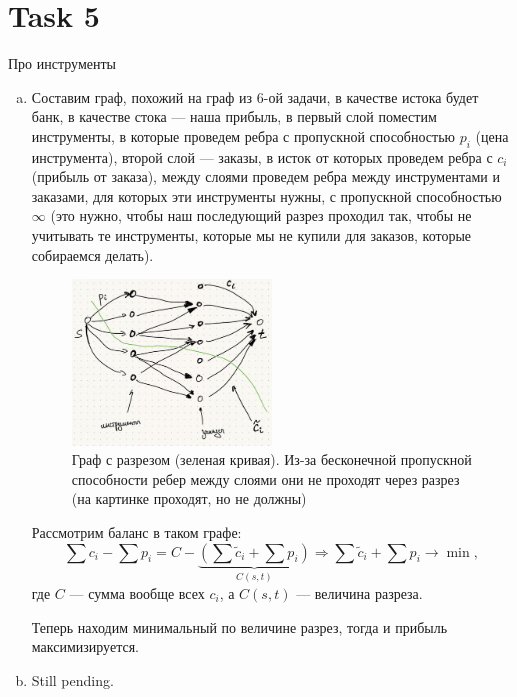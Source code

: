 \section{Task 5}
\begin{task}
    Про инструменты
\end{task}

\begin{solution}
    \begin{enumerate}[a)]
        \item Составим граф, похожий на граф из 6-ой задачи, в качестве истока будет банк, в качестве стока --- наша прибыль, в первый слой поместим инструменты, в которые проведем ребра с пропускной способностью $p_i$ (цена инструмента), второй слой --- заказы, в исток от которых проведем ребра с $c_i$ (прибыль от заказа), между слоями проведем ребра между инструментами и заказами, для которых эти инструменты нужны, с пропускной способностью $\infty$ (это нужно, чтобы наш последующий разрез проходил так, чтобы не учитывать те инструменты, которые мы не купили для заказов, которые собираемся делать).
        \begin{figure}[H]
            \centering
            \includegraphics[width=0.5\textwidth]{pics/5.jpg}
            \caption{Граф с разрезом (зеленая кривая). Из-за бесконечной пропускной способности ребер между слоями они не проходят через разрез (на картинке проходят, но не должны)}
        \end{figure}
        Рассмотрим баланс в таком графе:
        \begin{equation}
            \sum c_i - \sum p_i = C - \underbrace{(\sum\tilde{c}_i + \sum p_i)}_{C(s,t)} \Longrightarrow \sum \tilde{c}_i + \sum p_i \to \min,
        \end{equation}
        где $C$ --- сумма вообще всех $c_i$, а $C(s,t)$ --- величина разреза.

        Теперь находим минимальный по величине разрез, тогда и прибыль максимизируется.
        \item Still pending.
    \end{enumerate}
\end{solution}